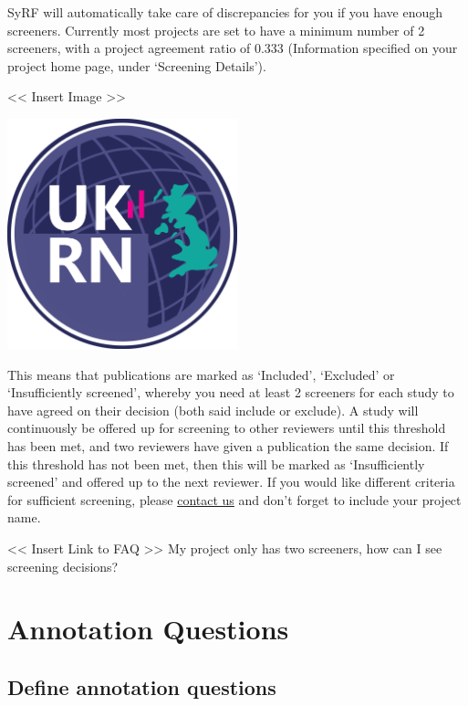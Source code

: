 \documentclass[]{book}
\begin{document}
SyRF will automatically take care of discrepancies for you if you have
enough screeners. Currently most projects are set to have a minimum
number of 2 screeners, with a project agreement ratio of 0.333
(Information specified on your project home page, under `Screening
Details').

\textless{}\textless{} Insert Image \textgreater{}\textgreater{}

\includegraphics[width=0.50000\textwidth,height=0.50000\textwidth]{figs/evidence-triangle.png}

This means that publications are marked as `Included', `Excluded' or
`Insufficiently screened', whereby you need at least 2 screeners for
each study to have agreed on their decision (both said include or
exclude). A study will continuously be offered up for screening to other
reviewers until this threshold has been met, and two reviewers have
given a publication the same decision. If this threshold has not been
met, then this will be marked as `Insufficiently screened' and offered
up to the next reviewer. If you would like different criteria for
sufficient screening, please
\href{mailtp:syrf.info@ed.ac.uk?subject=Screening\%20Criteria\%20in\%20SyRF}{contact
us} and don't forget to include your project name.

\textless{}\textless{} Insert Link to FAQ \textgreater{}\textgreater{}
My project only has two screeners, how can I see screening decisions?

\chapter{Annotation Questions}\label{annotation}

\section{Define annotation questions}\label{define-annotation-questions}
\end{document}

